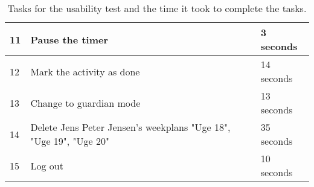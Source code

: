 \begin{table}[H]
\begin{tabular}{|p{1.3cm}|p{10cm}|p{1.7cm}|}
    11 & Pause the timer                                                                                                                & 3 seconds   \\ \hline
    12 & Mark the activity as done                                                                                                    & 14 seconds   \\ \hline
    13 & Change to guardian mode                                                                                                     & 13 seconds   \\ \hline
    14 & Delete Jens Peter Jensen's weekplans "Uge 18", "Uge 19", "Uge 20"                                                           & 35 seconds   \\ \hline
    15 & Log out                                                                                                                     & 10 seconds   \\ \hline
    \end{tabular}
    \caption{Tasks for the usability test and the time it took to complete the tasks.}\label{table:usability_tasks}
\end{table}

